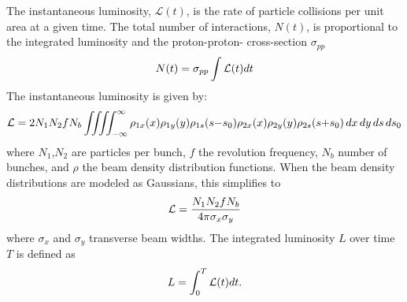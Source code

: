 

The instantaneous luminosity, $\mathcal{L}(t)$, is the rate of particle collisions per unit area at a given time. The total number of interactions, $N(t)$, is proportional to the integrated luminosity and the proton-proton- cross-section $\sigma_{pp}$
\begin{equation}
    \centering
    N(t) = \sigma_{pp} \int \mathcal{L} (t) dt
\end{equation}
The instantaneous luminosity is given by:
\begin{equation}
    \centering
    \mathcal{L} = 2 N_1 N_2 f N_b \int \!\!\! \int \!\!\! \int \!\!\! \int_{-\infty}^{\infty} \rho_{1x}(x)\rho_{1y}(y)\rho_{1s}(s{-}s_0)\rho_{2x}(x)\rho_{2y}(y)\rho_{2s}(s{+}s_0)\, dx\, dy\, ds\, ds_0
\end{equation}\label{eq:luminosity_long}
where $N_1$,$N_2$ are particles per bunch, $f$ the revolution frequency, $N_b$ number of bunches, and $\rho$ the beam density distribution functions. When the beam density distributions are modeled as Gaussians, this simplifies to
\begin{equation}
    \centering
    \mathcal{L} = \frac{N_1 N_2 f N_b}{4\pi \sigma_x \sigma_y}
\end{equation}
where $\sigma_x$ and $\sigma_y$ transverse beam widths. The integrated luminosity $L$ over time $T$ is defined as
\begin{equation}
    \centering
    L = \int_{0}^{T} \mathcal{L} (t) dt.
\end{equation}

